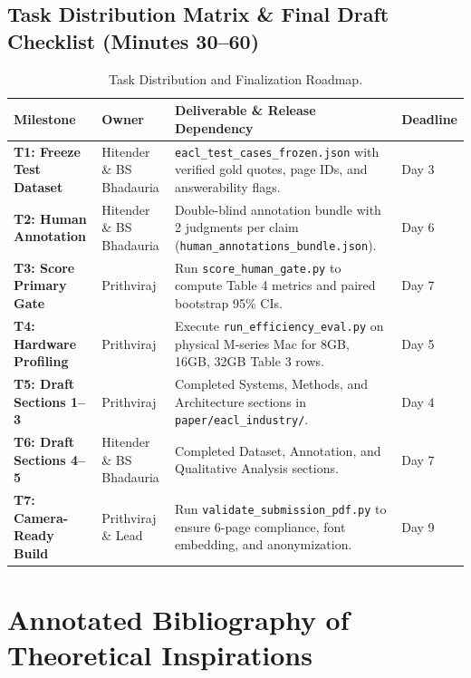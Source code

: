 \documentclass[11pt,a4paper]{article}
\begin{document}
\subsection{Task Distribution Matrix \& Final Draft Checklist (Minutes 30--60)}
\begin{table}[h]
\centering
\small
\begin{tabularx}{\textwidth}{llp{5.5cm}l}
\toprule
\textbf{Milestone} & \textbf{Owner} & \textbf{Deliverable \& Release Dependency} & \textbf{Deadline} \\
\midrule
\textbf{T1: Freeze Test Dataset} & Hitender \& BS Bhadauria & \texttt{eacl\_test\_cases\_frozen.json} with verified gold quotes, page IDs, and answerability flags. & Day 3 \\
\addlinespace
\textbf{T2: Human Annotation} & Hitender \& BS Bhadauria & Double-blind annotation bundle with 2 judgments per claim (\texttt{human\_annotations\_bundle.json}). & Day 6 \\
\addlinespace
\textbf{T3: Score Primary Gate} & Prithviraj & Run \texttt{score\_human\_gate.py} to compute Table 4 metrics and paired bootstrap 95\% CIs. & Day 7 \\
\addlinespace
\textbf{T4: Hardware Profiling} & Prithviraj & Execute \texttt{run\_efficiency\_eval.py} on physical M-series Mac for 8GB, 16GB, 32GB Table 3 rows. & Day 5 \\
\addlinespace
\textbf{T5: Draft Sections 1--3} & Prithviraj & Completed Systems, Methods, and Architecture sections in \texttt{paper/eacl\_industry/}. & Day 4 \\
\addlinespace
\textbf{T6: Draft Sections 4--5} & Hitender \& BS Bhadauria & Completed Dataset, Annotation, and Qualitative Analysis sections. & Day 7 \\
\addlinespace
\textbf{T7: Camera-Ready Build} & Prithviraj \& Lead & Run \texttt{validate\_submission\_pdf.py} to ensure 6-page compliance, font embedding, and anonymization. & Day 9 \\
\bottomrule
\end{tabularx}
\caption{Task Distribution and Finalization Roadmap.}
\end{table}

\vspace{12pt}

\section{Annotated Bibliography of Theoretical Inspirations}
\end{document}
